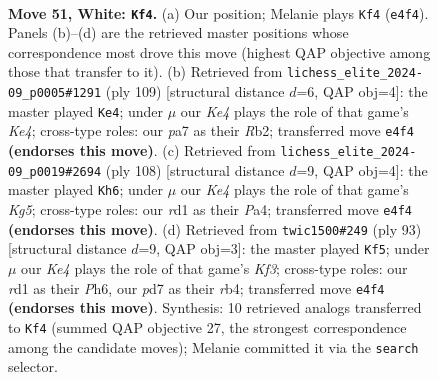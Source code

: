 \documentclass[11pt]{article}
\begin{document}
\clearpage

\begin{figure}[p]\centering
\begin{subfigure}{0.46\textwidth}\centering
\resizebox{\linewidth}{!}{%
\newchessgame
\chessboard[
  setfen={8/p2p4/2p4k/5P2/4K3/8/8/3r4 w - - 3 51},
  showmover=false,
  pgfstyle=straightmove, color=movearrow, markmove={e4-f4}
]}
\caption{}
\end{subfigure}\hfill
\begin{subfigure}{0.46\textwidth}\centering
\resizebox{\linewidth}{!}{%
\newchessgame
\chessboard[
  setfen={8/2K5/8/2P1kp2/8/3R2P1/1r6/8 b - - 3 55},
  showmover=false,
  pgfstyle=straightmove, color=movearrow, markmove={e5-e4}
]}
\caption{}
\end{subfigure}
\\[4pt]
\begin{subfigure}{0.46\textwidth}\centering
\resizebox{\linewidth}{!}{%
\newchessgame
\chessboard[
  setfen={8/p3k3/1p4P1/6K1/P7/8/8/8 w - - 0 55},
  showmover=false,
  pgfstyle=straightmove, color=movearrow, markmove={g5-h6}
]}
\caption{}
\end{subfigure}\hfill
\begin{subfigure}{0.46\textwidth}\centering
\resizebox{\linewidth}{!}{%
\newchessgame
\chessboard[
  setfen={8/8/4pk1p/8/PR5P/4K3/8/3r4 b - - 2 47},
  showmover=false,
  pgfstyle=straightmove, color=movearrow, markmove={f6-f5}
]}
\caption{}
\end{subfigure}
\caption{\textbf{Move 51, White: \texttt{Kf4}.} (a) Our position; Melanie plays \texttt{Kf4} (\texttt{e4f4}). Panels (b)--(d) are the retrieved master positions whose correspondence most drove this move (highest QAP objective among those that transfer to it). (b) Retrieved from \texttt{lichess\_elite\_2024-09\_p0005\#1291} (ply 109) [structural distance $d$=6, QAP obj=4]: the master played \texttt{Ke4}; under $\mu$ our \emph{Ke4} plays the role of that game's \emph{Ke4}; cross-type roles: our \emph{p}a7 as their \emph{R}b2; transferred move \texttt{e4f4} \textbf{(endorses this move)}. (c) Retrieved from \texttt{lichess\_elite\_2024-09\_p0019\#2694} (ply 108) [structural distance $d$=9, QAP obj=4]: the master played \texttt{Kh6}; under $\mu$ our \emph{Ke4} plays the role of that game's \emph{Kg5}; cross-type roles: our \emph{r}d1 as their \emph{P}a4; transferred move \texttt{e4f4} \textbf{(endorses this move)}. (d) Retrieved from \texttt{twic1500\#249} (ply 93) [structural distance $d$=9, QAP obj=3]: the master played \texttt{Kf5}; under $\mu$ our \emph{Ke4} plays the role of that game's \emph{Kf3}; cross-type roles: our \emph{r}d1 as their \emph{P}h6, our \emph{p}d7 as their \emph{r}b4; transferred move \texttt{e4f4} \textbf{(endorses this move)}. Synthesis: 10 retrieved analogs transferred to \texttt{Kf4} (summed QAP objective 27, the strongest correspondence among the candidate moves); Melanie committed it via the \texttt{search} selector.}
\label{fig:thought-m100}
\end{figure}
\end{document}
